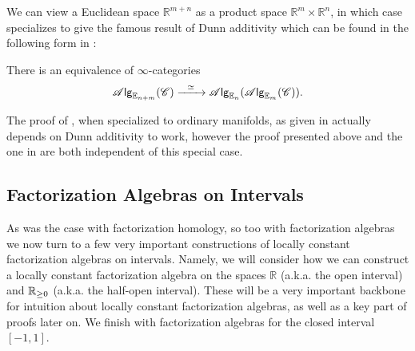 \documentclass[../text]{subfiles}
\begin{document}
\begin{example}
    We can view a Euclidean space $\mathbb{R}^{m+n}$ as a product space $\mathbb{R}^m \times \mathbb{R}^n$, in which case  specializes to give the famous result of Dunn additivity \cite{dunn1988} which can be found in the following form in \cite{lurie_ha}:

    \begin{proposition}\label{prop:dunn_additivity}
        There is an equivalence of $\infty$-categories
        \begin{equation}
            \mathscr{A} \mathsf{lg}_{\mathbb{E}_{n + m}} (\mathscr{C}) \xrightarrow{\ \ \simeq \ \ } \mathscr{A} \mathsf{lg}_{\mathbb{E}_n} (\mathscr{A} \mathsf{lg}_{\mathbb{E}_m} (\mathscr{C})).
        \end{equation}
    \end{proposition}
\end{example}


\begin{remark}
    The proof of , when specialized to ordinary manifolds, as given in \cite{ginot2015} actually depends on Dunn additivity to work, however the proof presented above and the one in \cite{lurie_ha} are both independent of this special case. 
\end{remark}





\subsection{Factorization Algebras on Intervals}\label{ssec:lcfa_on_ints}

As was the case with factorization homology, so too with factorization algebras we now turn to a few very important constructions of locally constant factorization algebras on intervals. Namely, we will consider how we can construct a locally constant factorization algebra on the spaces $\mathbb{R}$ (a.k.a. the open interval) and $\mathbb{R}_{\geq 0}$ (a.k.a. the half-open interval). These will be a very important backbone for intuition about locally constant factorization algebras, as well as a key part of proofs later on. We finish with factorization algebras for the closed interval $[-1,1]$.
\end{document}
